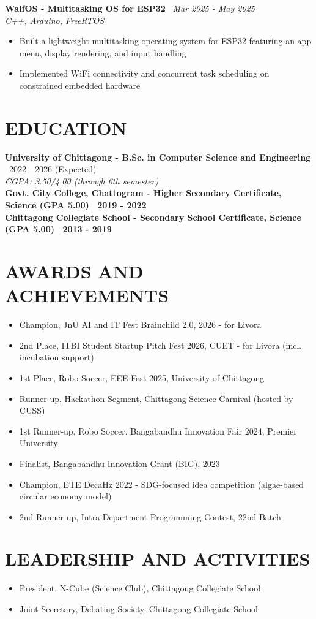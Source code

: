 \documentclass[10.5pt,a4paper]{article}
\newenvironment{tightitemize}{
  \begin{itemize}[leftmargin=15pt, itemsep=0pt, parsep=0pt, topsep=1pt]
}{
  \end{itemize}
}
\newcommand{\entry}[3]{%
  \textbf{#1} \textbar\ #2\\
  \textit{#3}%
}
\newcommand{\entrysimple}[2]{%
  \textbf{#1} \textbar\ \textit{#2}\\[1pt]
}
\newcommand{\entrybold}[2]{%
  \textbf{#1 \textbar\ #2}%
}
\begin{document}
\entrysimple{WaifOS - Multitasking OS for ESP32}{Mar 2025 - May 2025}
\textit{C++, Arduino, FreeRTOS}
\begin{tightitemize}
  \item Built a lightweight multitasking operating system for ESP32 featuring an app menu, display rendering, and input handling
  \item Implemented WiFi connectivity and concurrent task scheduling on constrained embedded hardware
\end{tightitemize}

\section*{EDUCATION}
\entry{University of Chittagong - B.Sc. in Computer Science and Engineering}{2022 - 2026 (Expected)}{CGPA: 3.50/4.00 (through 6th semester)}\\[4pt]
\entrybold{Govt. City College, Chattogram - Higher Secondary Certificate, Science (GPA 5.00)}{2019 - 2022}\\[2pt]
\entrybold{Chittagong Collegiate School - Secondary School Certificate, Science (GPA 5.00)}{2013 - 2019}

\section*{AWARDS AND ACHIEVEMENTS}
\begin{tightitemize}
  \item Champion, JnU AI and IT Fest Brainchild 2.0, 2026 - for Livora
  \item 2nd Place, ITBI Student Startup Pitch Fest 2026, CUET - for Livora (incl. incubation support)
  \item 1st Place, Robo Soccer, EEE Fest 2025, University of Chittagong
  \item Runner-up, Hackathon Segment, Chittagong Science Carnival (hosted by CUSS)
  \item 1st Runner-up, Robo Soccer, Bangabandhu Innovation Fair 2024, Premier University
  \item Finalist, Bangabandhu Innovation Grant (BIG), 2023
  \item Champion, ETE DecaHz 2022 - SDG-focused idea competition (algae-based circular economy model)
  \item 2nd Runner-up, Intra-Department Programming Contest, 22nd Batch
\end{tightitemize}

\section*{LEADERSHIP AND ACTIVITIES}
\begin{tightitemize}
  \item President, N-Cube (Science Club), Chittagong Collegiate School
  \item Joint Secretary, Debating Society, Chittagong Collegiate School
\end{tightitemize}
\end{document}

